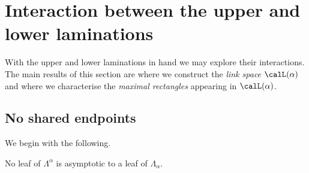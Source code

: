 \documentclass[12pt]{amsart}
\begin{document}
\section{Interaction between the upper and lower laminations}
\label{Sec:LaminationInteractions}

With the upper and lower laminations in hand we may explore their interactions.  The main results of this section are  where we construct the \emph{link space} $\calL(\alpha)$ and  where we characterise the \emph{maximal rectangles} appearing in $\calL(\alpha)$. 

\subsection{No shared endpoints}

We begin with the following. 

\begin{lemma}
\label{Lem:NoMixedTypeAsymptotics}
No leaf of $\Lambda^\alpha$ is asymptotic to a leaf of $\Lambda_\alpha$.
\end{lemma}
\end{document}
